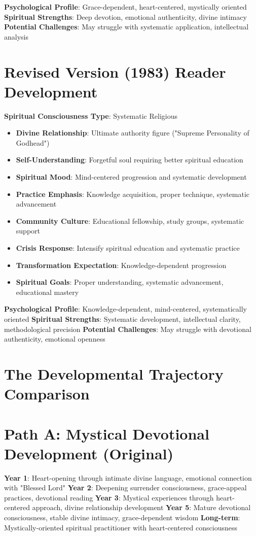 \documentclass[11pt,twoside]{book}
\begin{document}
\textbf{\textbf{Psychological Profile}}: Grace-dependent, heart-centered, mystically oriented
\textbf{\textbf{Spiritual Strengths}}: Deep devotion, emotional authenticity, divine intimacy
\textbf{\textbf{Potential Challenges}}: May struggle with systematic application, intellectual analysis
\section*{Revised Version (1983) Reader Development}
\label{sec:org1eb4f04}

\textbf{\textbf{Spiritual Consciousness Type}}: Systematic Religious  
\begin{itemize}
\item \textbf{\textbf{Divine Relationship}}: Ultimate authority figure ("Supreme Personality of Godhead")
\item \textbf{\textbf{Self-Understanding}}: Forgetful soul requiring better spiritual education
\item \textbf{\textbf{Spiritual Mood}}: Mind-centered progression and systematic development
\item \textbf{\textbf{Practice Emphasis}}: Knowledge acquisition, proper technique, systematic advancement
\item \textbf{\textbf{Community Culture}}: Educational fellowship, study groups, systematic support
\item \textbf{\textbf{Crisis Response}}: Intensify spiritual education and systematic practice
\item \textbf{\textbf{Transformation Expectation}}: Knowledge-dependent progression
\item \textbf{\textbf{Spiritual Goals}}: Proper understanding, systematic advancement, educational mastery
\end{itemize}

\textbf{\textbf{Psychological Profile}}: Knowledge-dependent, mind-centered, systematically oriented
\textbf{\textbf{Spiritual Strengths}}: Systematic development, intellectual clarity, methodological precision
\textbf{\textbf{Potential Challenges}}: May struggle with devotional authenticity, emotional openness
\section*{The Developmental Trajectory Comparison}
\label{sec:orgfd306de}

\section*{Path A: Mystical Devotional Development (Original)}
\label{sec:org56f38e2}
\textbf{\textbf{Year 1}}: Heart-opening through intimate divine language, emotional connection with "Blessed Lord"
\textbf{\textbf{Year 2}}: Deepening surrender consciousness, grace-appeal practices, devotional reading
\textbf{\textbf{Year 3}}: Mystical experiences through heart-centered approach, divine relationship development
\textbf{\textbf{Year 5}}: Mature devotional consciousness, stable divine intimacy, grace-dependent wisdom
\textbf{\textbf{Long-term}}: Mystically-oriented spiritual practitioner with heart-centered consciousness
\end{document}
